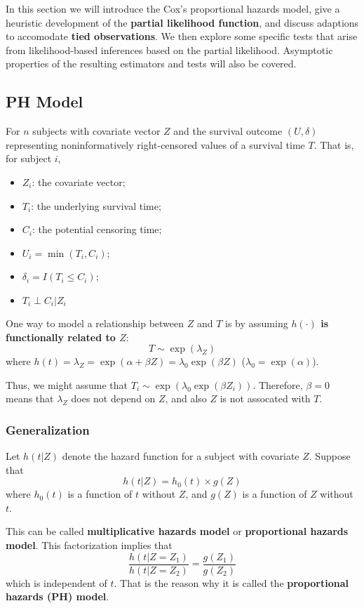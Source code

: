 \documentclass[11pt,addpoints,answers]{exam}
\begin{document}
\begin{CJK*}{UTF8}{gbsn}
In this section we will introduce the Cox's proportional hazards model, give a heuristic 
development of the \textbf{partial likelihood function}, and discuss adaptions to 
accomodate \textbf{tied observations}. We then explore some specific tests that arise 
from likelihood-based inferences based on the partial likelihood. Asymptotic properties 
of the resulting estimators and tests will also be covered.

\subsection{PH Model}
For $n$ subjects with covariate vector $Z$ and the survival outcome $(U, \delta)$ 
representing noninformatively right-censored values of a survival time $T$. That is, 
for subject $i$,
\begin{itemize}
	\item $Z_i$: the covariate vector;
	\item $T_i$: the underlying survival time;
	\item $C_i$: the potential censoring time;
	\item $U_i = \min(T_i, C_i)$;
	\item $\delta_i = I(T_i \le C_i)$;
	\item $T_i \perp C_i | Z_i$
\end{itemize}

One way to model a relationship between $Z$ and $T$ is by assuming \textbf{$h(\cdot)$ 
is functionally related to $Z$}:
$$
T \sim \exp(\lambda_Z)
$$
where $h(t) = \lambda_Z = \exp(\alpha + \beta Z) = \lambda_0 \exp(\beta Z)$ ($\lambda_0 = \exp(\alpha)$).

Thus, we might assume that $T_i \sim \exp(\lambda_0 \exp(\beta Z_i))$. Therefore, 
$\beta=0$ means that $\lambda_Z$ does not depend on $Z$, and also $Z$ is not assocated 
with $T$.

\subsubsection{Generalization}
Let $h(t|Z)$ denote the hazard function for a subject with covariate $Z$. Suppose that
$$
h(t | Z) = h_0(t) \times g(Z)
$$
where $h_0(t)$ is a function of $t$ without $Z$, and $g(Z)$ is a function of $Z$ without 
$t$.

This can be called \textbf{multiplicative hazards model} or \textbf{proportional hazards 
model}. This factorization implies that
$$
\frac{h(t|Z=Z_1)}{h(t|Z=Z_2)} = \frac{g(Z_1)}{g(Z_2)}
$$
which is independent of $t$. That is the reason why it is called the \textbf{proportional 
hazards (PH) model}.


\end{CJK*}
\end{document}
